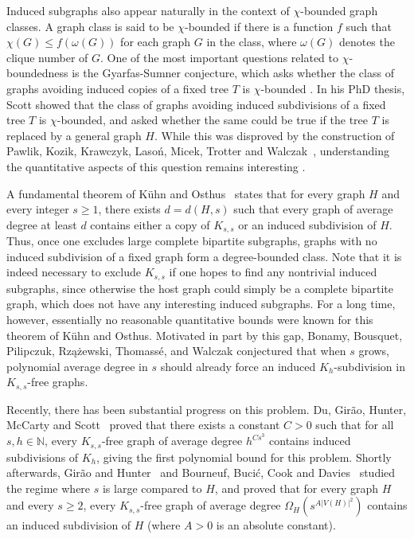 \documentclass[10pt, a4paper]{article}
\numberwithin{theorem}{section} %
\theoremstyle{remark}
\theoremstyle{definition}
\begin{document}
Induced subgraphs also appear naturally in the context of $\chi$-bounded graph classes. A graph class is said to be $\chi$-bounded if there is a function $f$ such that $\chi(G)\leq f(\omega(G))$ for each graph $G$ in the class, where $\omega (G)$ denotes the clique number of $G$. One of the most important questions related to $\chi$-boundedness is the Gyarfas-Sumner conjecture, which asks whether the class of graphs avoiding induced copies of a fixed tree $T$ is $\chi$-bounded \cite{Gyarfas,Sumner}. In his PhD thesis, Scott showed that the class of graphs avoiding induced subdivisions of a fixed tree $T$ is $\chi$-bounded, and asked whether the same could be true if the tree $T$ is replaced by a general graph $H$. While this was disproved by the construction of Pawlik, Kozik, Krawczyk, Laso\'n, Micek, Trotter and Walczak~\cite{PawlikKozikKrawczykLasonMicekTrotterWalczak14}, understanding the quantitative aspects of this question remains interesting \cite{NguyenScottSeymour}.

A fundamental theorem of K\"uhn and Osthus~\cite{KuhnOsthus04Induced} states that for every graph $H$ and every integer $s\ge 1$, there exists $d=d(H,s)$ such that every graph of average degree at least $d$ contains either a copy of $K_{s,s}$ or an induced subdivision of $H$. Thus, once one excludes large complete bipartite subgraphs, graphs with no induced subdivision of a fixed graph form a degree-bounded class. Note that it is indeed necessary to exclude $K_{s, s}$ if one hopes to find any nontrivial induced subgraphs, since otherwise the host graph could simply be a complete bipartite graph, which does not have any interesting induced subgraphs. For a long time, however, essentially no reasonable quantitative bounds were known for this theorem of K\"uhn and Osthus. Motivated in part by this gap, Bonamy, Bousquet, Pilipczuk, Rzążewski, Thomass\'e, and Walczak \cite{BBPRTW22} conjectured that when $s$ grows, polynomial average degree in $s$ should already force an induced $K_{h}$-subdivision in $K_{s, s}$-free graphs.

Recently, there has been substantial progress on this problem. Du, Gir\~ao, Hunter, McCarty and Scott~\cite{DuGiraoHunterMcCartyScott25} proved that there exists a constant $C>0$ such that for all $s,h\in\mathbb{N}$, every $K_{s,s}$-free graph of average degree $h^{Cs^3}$ contains induced subdivisions of $K_h$, giving the first polynomial bound for this problem. Shortly afterwards, Gir\~ao and Hunter~\cite{GiraoHunter25} and Bourneuf, Buci\'c, Cook and Davies~\cite{BBCD24} studied the regime where $s$ is large compared to $H$, and proved that for every graph $H$ and every $s\ge 2$, every $K_{s, s}$-free graph of average degree $\Omega_H(s^{A|V(H)|^2})$ contains an induced subdivision of $H$ (where $A>0$ is an absolute constant).%
\end{document}
